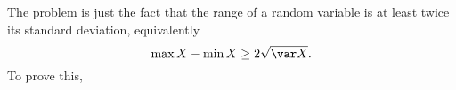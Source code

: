 The problem is just the fact that the range of a random variable is at least twice its standard deviation, equivalently
\[
	\max X-\min X\geq2\sqrt{\var X}.
\]
To prove this, 